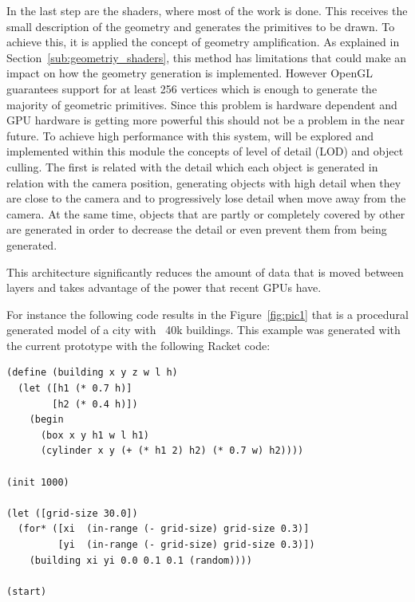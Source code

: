 In the last step are the shaders, where most of the work is done. This receives the small description of the geometry and generates the primitives to be drawn. To achieve this, it is applied the concept of geometry amplification. As explained in Section~\ref{sub:geometriy_shaders}, this method has limitations that could make an impact on how the geometry generation is implemented. However OpenGL guarantees support for at least 256 vertices which is enough to generate the majority of geometric primitives. Since this problem is hardware dependent and GPU hardware is getting more powerful this should not be a problem in the near future. 
To achieve high performance with this system, will be explored and implemented within this module the concepts of level of detail (LOD) and object culling. The first is related with the detail which each object is generated in relation with the camera position, generating  objects with high detail when they are close to the camera and to progressively lose detail when move away from the camera.  At the same time, objects that are partly or completely covered by other are generated in order to decrease the detail or even prevent them from being generated.

This architecture significantly reduces the amount of data that is moved between layers and takes advantage of the power that recent GPUs have.

For instance the following code results in the Figure~\ref{fig:pic1} that is a procedural generated model of a city with ~40k buildings. This example was generated with the current prototype with the following Racket code:



\lstset{style=racket}
\begin{lstlisting}
(define (building x y z w l h)
  (let ([h1 (* 0.7 h)]
        [h2 (* 0.4 h)])
    (begin
      (box x y h1 w l h1)
      (cylinder x y (+ (* h1 2) h2) (* 0.7 w) h2))))

(init 1000)

(let ([grid-size 30.0])
  (for* ([xi  (in-range (- grid-size) grid-size 0.3)]
         [yi  (in-range (- grid-size) grid-size 0.3)])
    (building xi yi 0.0 0.1 0.1 (random))))

(start)
\end{lstlisting}


